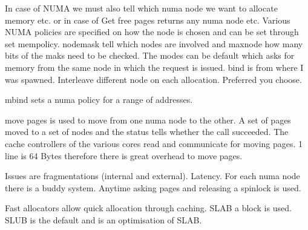 \documentclass[twoside]{article}
\begin{document}
In case of NUMA we must also tell which numa node we want to allocate memory etc. or in case of Get free pages returns any numa node etc. Various NUMA policies are specified on how the node is chosen and can be set through set mempolicy. nodemask tell which nodes are involved and maxnode how many bits of the maks need to be checked. The modes can be default which asks for memory from the same node in which the request is issued. bind is from where I was spawned. Interleave different node on each allocation. Preferred you choose.

mbind sets a numa policy for a range of addresses.

move pages is used to move from one numa node to the other. A set of pages moved to a set of nodes and the status tells whether the call succeeded. The cache controllers of the various cores read and communicate for moving pages. 1 line is 64 Bytes therefore there is great overhead to move pages.

Issues are fragmentations (internal and external). Latency. For each numa node there is a buddy system. Anytime asking pages and releasing a spinlock is used.

Fast allocators allow quick allocation through caching. SLAB a block is used. SLUB is the default and is an optimisation of SLAB.

\newpage


\end{document}
